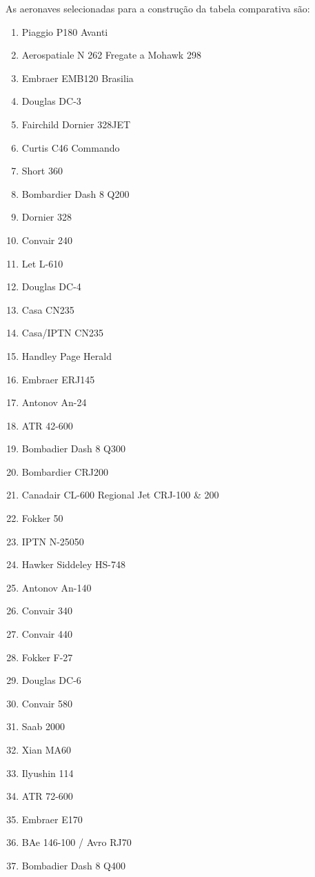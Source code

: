 As aeronaves selecionadas para a construção da tabela comparativa são:
\begin{multicols}{2}
  \begin{enumerate}
    \item Piaggio P180 Avanti
    \item Aerospatiale N 262 Fregate a Mohawk 298
    \item Embraer EMB120 Brasilia
    \item Douglas DC-3
    \item Fairchild Dornier 328JET
    \item Curtis C46 Commando
    \item Short 360
    \item Bombardier Dash 8 Q200
    \item Dornier 328
    \item Convair 240
    \item Let L-610
    \item Douglas DC-4
    \item Casa CN235
    \item Casa/IPTN CN235
    \item Handley Page Herald
    \item Embraer ERJ145
    \item Antonov An-24
    \item ATR 42-600
    \item Bombadier Dash 8 Q300
    \item Bombardier CRJ200
    \item Canadair CL-600 Regional Jet CRJ-100 \& 200
    \item Fokker 50
    \item IPTN N-25050
    \item Hawker Siddeley HS-748
    \item Antonov An-140
    \item Convair 340
    \item Convair 440
    \item Fokker F-27
    \item Douglas DC-6
    \item Convair 580
    \item Saab 2000
    \item Xian MA60
    \item Ilyushin 114
    \item ATR 72-600
    \item Embraer E170
    \item BAe 146-100 / Avro RJ70
    \item Bombadier Dash 8 Q400
  \end{enumerate}
\end{multicols}

